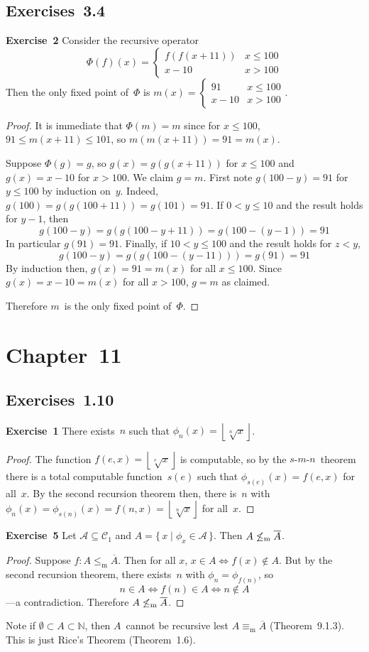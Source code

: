 \documentclass[letterpaper]{article}
\newcommand{\exercise}[2][]{\noindent\textbf{Exercise~{#2}}\ifthenelse{\isempty{#1}}{\textbf{.}}{ ({#1})\textbf{.}}}
\newcommand{\A}{\mathcal{A}}
\newcommand{\C}{\mathcal{C}}
\newcommand{\N}{\mathbb{N}}
\newcommand{\mr}{\mathrel{\le_{\mathrm{m}}}}
\newcommand{\me}{\mathrel{\equiv_{\mathrm{m}}}}
\newcommand{\floor}[1]{\left\lfloor{#1}\right\rfloor}
\newcommand{\smn}{$s$-$m$-$n$}
\theoremstyle{plain}
\theoremstyle{definition}
\theoremstyle{remark}
\begin{document}
\subsection*{Exercises~3.4}
\exercise{2}
Consider the recursive operator
$$\Phi(f)(x)=\begin{cases}
f(f(x+11))&x\le 100\\
x-10&x>100
\end{cases}$$
Then the only fixed point of~$\Phi$ is $m(x)=\begin{cases}91&x\le 100\\x-10&x>100\end{cases}$.
\begin{proof}
It is immediate that $\Phi(m)=m$ since for $x\le 100$, $91\le m(x+11)\le 101$, so $m(m(x+11))=91=m(x)$.

Suppose $\Phi(g)=g$, so $g(x)=g(g(x+11))$ for $x\le 100$ and $g(x)=x-10$ for $x>100$. We claim $g=m$. First note $g(100-y)=91$ for $y\le 100$ by induction on~$y$. Indeed, $g(100)=g(g(100+11))=g(101)=91$. If $0<y\le 10$ and the result holds for $y-1$, then
$$g(100-y)=g(g(100-y+11))=g(100-(y-1))=91$$
In particular $g(91)=91$. Finally, if $10<y\le 100$ and the result holds for $z<y$,
$$g(100-y)=g(g(100-(y-11)))=g(91)=91$$
By induction then, $g(x)=91=m(x)$ for all $x\le 100$. Since $g(x)=x-10=m(x)$ for all $x>100$, $g=m$ as claimed.

Therefore $m$~is the only fixed point of~$\Phi$.
\end{proof}

\section*{Chapter~11}
\subsection*{Exercises~1.10}
\exercise{1}
There exists~$n$ such that $\phi_n(x)=\floor{\sqrt[n]{x}}$.
\begin{proof}
The function $f(e,x)=\floor{\sqrt[e]{x}}$ is computable, so by the \smn\ theorem there is a total computable function~$s(e)$ such that $\phi_{s(e)}(x)=f(e,x)$ for all~$x$. By the second recursion theorem then, there is~$n$ with $\phi_n(x)=\phi_{s(n)}(x)=f(n,x)=\floor{\sqrt[n]{x}}$ for all~$x$.
\end{proof}

\exercise{5}
Let $\A\subseteq\C_1$ and $A=\{\,x\mid\phi_x\in\A\,\}$. Then $A\not\mr\overline{A}$.
\begin{proof}
Suppose $f:A\mr\overline{A}$. Then for all $x$, $x\in A\iff f(x)\not\in A$. But by the second recursion theorem, there exists~$n$ with $\phi_n=\phi_{f(n)}$, so
$$n\in A\iff f(n)\in A\iff n\not\in A$$
---a contradiction. Therefore $A\not\mr\overline{A}$.
\end{proof}
\noindent Note if $\emptyset\subset A\subset\N$, then $A$~cannot be recursive lest $A\me\overline{A}$ (Theorem~9.1.3). This is just Rice's Theorem (Theorem~1.6).
\end{document}
